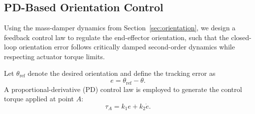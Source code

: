 \documentclass[journal]{IEEEtran}
\begin{document}







\subsection{PD-Based Orientation Control}
\label{sec:pd}

Using the mass-damper dynamics from Section~\ref{sec:orientation}, we design a feedback control law to regulate the end-effector orientation, such that the closed-loop orientation error follows critically damped second-order dynamics while respecting actuator torque limits.

Let $\theta_{\mathrm{ref}}$ denote the desired orientation and define the tracking error as
%
\begin{equation}
e = \theta_{\mathrm{ref}} - \theta.
\end{equation}
%
A proportional-derivative (PD) control law is employed to generate the control torque applied at point $A$:
%
\begin{equation}
\tau_A = k_1 e + k_2 \dot{e}.
\label{eq:pd_control}
\end{equation}
%
\end{document}
